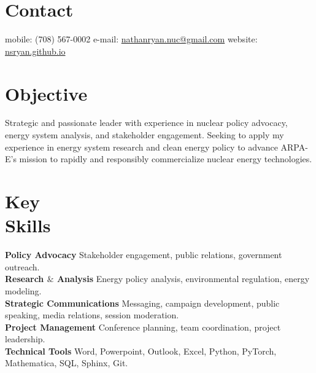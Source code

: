 \documentclass[margin,line]{resume}
\begin{document}
\begin{resume}

%


    \section{\mysidestyle Contact}
    mobile: (708) 567-0002 \hfill e-mail: \href{mailto:nathanryan.nuc@gmail.com}{nathanryan.nuc@gmail.com} \hfill website: \href{https://nsryan.github.io}{nsryan.github.io} \vspace{0mm}\\\vspace{1mm}%

    \vspace{-6mm}
    \section{\mysidestyle Objective}
        Strategic and passionate leader with experience in nuclear policy advocacy, energy system analysis, and stakeholder engagement. Seeking to apply my experience in energy system research and clean energy policy to advance ARPA-E's mission to rapidly and responsibly commercialize nuclear energy technologies.
    \section{\mysidestyle Key\\Skills}
        \textbf{Policy Advocacy} Stakeholder engagement, public relations, government outreach.\vspace{1mm}\\
        \textbf{Research $\&$ Analysis} Energy policy analysis, environmental regulation, energy modeling.\vspace{1mm}\\
        \textbf{Strategic Communications} Messaging, campaign development, public speaking, media relations, session moderation.\vspace{1mm}\\
        \textbf{Project Management} Conference planning, team coordination, project leadership.\vspace{1mm}\\
        \textbf{Technical Tools} Word, Powerpoint, Outlook, Excel, Python, PyTorch, Mathematica, SQL, Sphinx, Git.\vspace{1mm}

\end{resume}
\end{document}
